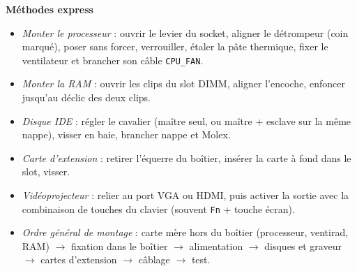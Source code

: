 \documentclass[11pt]{article}
\begin{document}
\begin{bilan}
\textbf{Méthodes express}
\begin{itemize}
  \item \emph{Monter le processeur} : ouvrir le levier du socket, aligner le détrompeur (coin marqué), poser sans forcer, verrouiller, étaler la pâte thermique, fixer le ventilateur et brancher son câble \texttt{CPU\_FAN}.
  \item \emph{Monter la RAM} : ouvrir les clips du slot DIMM, aligner l'encoche, enfoncer jusqu'au déclic des deux clips.
  \item \emph{Disque IDE} : régler le cavalier (maître seul, ou maître + esclave sur la même nappe), visser en baie, brancher nappe et Molex.
  \item \emph{Carte d'extension} : retirer l'équerre du boîtier, insérer la carte à fond dans le slot, visser.
  \item \emph{Vidéoprojecteur} : relier au port VGA ou HDMI, puis activer la sortie avec la combinaison de touches du clavier (souvent \texttt{Fn} + touche écran).
  \item \emph{Ordre général de montage} : carte mère hors du boîtier (processeur, ventirad, RAM) $\rightarrow$ fixation dans le boîtier $\rightarrow$ alimentation $\rightarrow$ disques et graveur $\rightarrow$ cartes d'extension $\rightarrow$ câblage $\rightarrow$ test.
\end{itemize}
\end{bilan}
\end{document}
